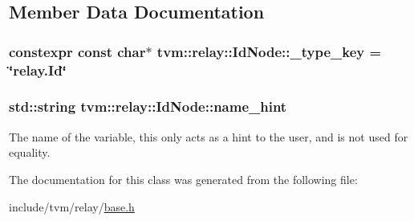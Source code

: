 \subsection{Member Data Documentation}
\subsubsection[{\texorpdfstring{\+\_\+type\+\_\+key}{_type_key}}]{\setlength{\rightskip}{0pt plus 5cm}constexpr const char$\ast$ tvm\+::relay\+::\+Id\+Node\+::\+\_\+type\+\_\+key = \char`\"{}relay.\+Id\char`\"{}\hspace{0.3cm}{\ttfamily [static]}}\hypertarget{classtvm_1_1relay_1_1IdNode_a1dc655dcc84c2309ce4f461d98d702ec}{}\label{classtvm_1_1relay_1_1IdNode_a1dc655dcc84c2309ce4f461d98d702ec}
\subsubsection[{\texorpdfstring{name\+\_\+hint}{name_hint}}]{\setlength{\rightskip}{0pt plus 5cm}std\+::string tvm\+::relay\+::\+Id\+Node\+::name\+\_\+hint}\hypertarget{classtvm_1_1relay_1_1IdNode_ae52f93185d084c36b2fe99b1aa512909}{}\label{classtvm_1_1relay_1_1IdNode_ae52f93185d084c36b2fe99b1aa512909}


The name of the variable, this only acts as a hint to the user, and is not used for equality. 



The documentation for this class was generated from the following file\+:\begin{DoxyCompactItemize}
\item 
include/tvm/relay/\hyperlink{base_8h}{base.\+h}\end{DoxyCompactItemize}
